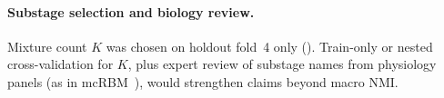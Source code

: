 \paragraph*{Substage selection and biology review.}
Mixture count $K$ was chosen on holdout fold~4 only ().
Train-only or nested cross-validation for $K$, plus expert review of substage names from physiology panels (as in mcRBM~\cite{katsageorgiou2018mcRBM}), would strengthen claims beyond macro NMI.
